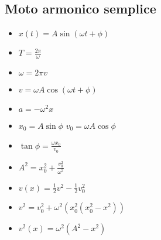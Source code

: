 	\subsection{Moto armonico semplice}
	\begin{itemize}
		\item $x(t)=A\sin(\omega t+\phi)$
		\item $T = \frac{2\pi}{\omega}$
		\item $\omega = 2\pi v$
		\item $v = \omega A\cos(\omega t+\phi)$
		\item $a = -\omega^2 x$
		\item $x_0 = A\sin\phi$ $v_0 = \omega A\cos \phi$
		\item $\tan\phi = \frac{\omega x_0}{v_0}$
		\item $A^2 = x_0^2 + \frac{v_0^2}{\omega^2}$
		\item $v(x) = \frac{1}{2}v^2-\frac{1}{2}v_0^2$
		\item $v^2 = v_0^2+\omega^2(x_0^2(x_0^2 - x^2))$
		\item $v^2(x) = \omega^2(A^2-x^2)$
	\end{itemize}
